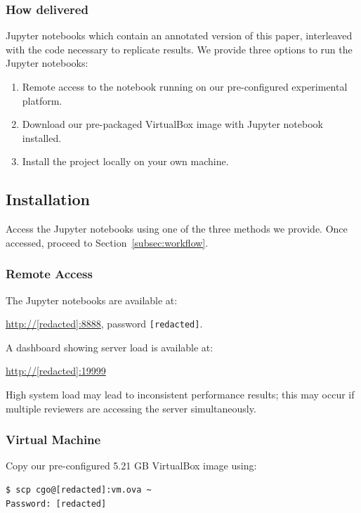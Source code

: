 \subsubsection{How delivered}

Jupyter notebooks which contain an annotated version of this paper, interleaved with the code necessary to replicate results. We provide three options to run the Jupyter notebooks:
\begin{enumerate}
  \item Remote access to the notebook running on our pre-configured experimental platform.
  \item Download our pre-packaged VirtualBox image with Jupyter notebook installed.
  \item Install the project locally on your own machine.
\end{enumerate}

\subsection{Installation}\label{subsec:installation}

Access the Jupyter notebooks using one of the three methods we provide. Once accessed, proceed to Section~\ref{subsec:workflow}.

\subsubsection{Remote Access}

The Jupyter notebooks are available at:

\url{http://[redacted]:8888}, password \texttt{[redacted]}.

\vspace{1em}
\noindent
A dashboard showing server load is available at:

\url{http://[redacted]:19999}

\vspace{1em}
\noindent
High system load may lead to inconsistent performance results; this may occur if multiple reviewers are accessing the server simultaneously.

\newpage
\subsubsection{Virtual Machine}

Copy our pre-configured 5.21 GB VirtualBox image using:
\begin{verbatim}
$ scp cgo@[redacted]:vm.ova ~
Password: [redacted]
\end{verbatim}

